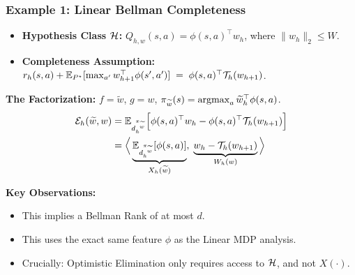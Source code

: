 \documentclass[aspectratio=169]{beamer}
\begin{document}
\begin{frame}\frametitle{Example 1: Linear Bellman Completeness}

\begin{itemize}
    \item \textbf{Hypothesis Class $\mathcal{H}$:} $Q_{h,w}(s,a) = \phi(s,a)^\top w_h$, where $\|w_h\|_2 \le W$.
    \item \textbf{Completeness Assumption:} $r_h(s,a) + \mathbb{E}_{P^\star}[\max_{a'} w_{h+1}^\top \phi(s',a')] \;=\; \phi(s,a)^\top \mathcal{T}_h(w_{h+1})$.
\end{itemize}

\pause
\vspace{0.2cm}
\textbf{The Factorization:} $f=\widetilde w$, $g=w$, $\pi_{\widetilde w }(s) = \operatorname*{argmax}_a \widetilde w_h^\top \phi(s,a)$.
\begin{align*}
\mathcal{E}_h(\widetilde w,w) &= \mathbb{E}_{d_h^{\pi_{\widetilde w}}}\Big[ \phi(s,a)^\top w_{h} - \phi(s,a)^\top \mathcal{T}_h(w_{h+1}) \Big] \\
&= \Big\langle \underbrace{\mathbb{E}_{d_h^{\pi_{\widetilde w}}}[\phi(s,a)]}_{X_h(\widetilde w)}, \; \underbrace{w_{h} - \mathcal{T}_h(w_{h+1})}_{W_h(w)} \Big\rangle
\end{align*}

\pause
\textbf{Key Observations:}
\begin{itemize}
    \item This implies a Bellman Rank of at most $d$.
    \item This uses the exact same feature $\phi$ as the Linear MDP analysis.
    \item \alert{Crucially:} Optimistic Elimination only requires
      access to $\mathcal{H}$, and not $X(\cdot)$.
\end{itemize}
\end{frame}
\end{document}

